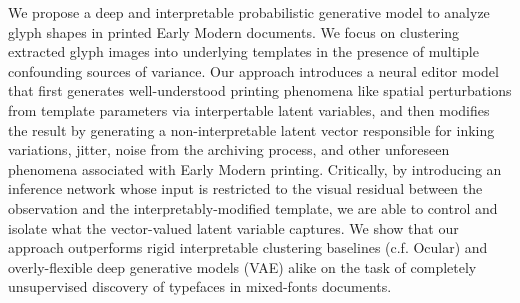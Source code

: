 We propose a deep and interpretable probabilistic generative model to analyze glyph shapes in printed Early Modern documents. We focus on clustering extracted glyph images into underlying templates in the presence of multiple confounding sources of variance. Our approach introduces a neural editor model that first generates well-understood printing phenomena like spatial perturbations from template parameters via interpertable latent variables, and then modifies the result by generating a non-interpretable latent vector responsible for inking variations, jitter, noise from the archiving process, and other unforeseen phenomena associated with Early Modern printing. Critically, by introducing an inference network whose input is restricted to the visual residual between the observation and the interpretably-modified template, we are able to control and isolate what the vector-valued latent variable captures. We show that our approach outperforms rigid interpretable clustering baselines (c.f. Ocular) and overly-flexible deep generative models (VAE) alike on the task of completely unsupervised discovery of typefaces in mixed-fonts documents.

